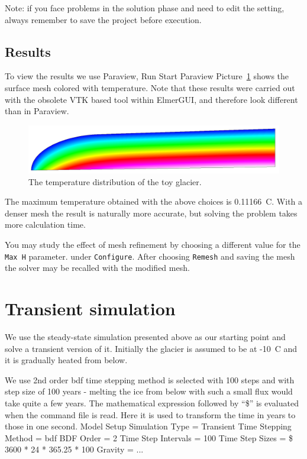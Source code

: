 Note: if you face problems in the solution phase and need to edit the setting, always remember to save
the project before execution.

\subsection*{Results}

To view the results we use Paraview,
\ttbegin
Run
  Start Paraview
\ttend
Picture~\ref{glac:figtemp} shows
the surface mesh colored with temperature.
Note that these results were carried out with the obsolete
VTK based tool within ElmerGUI, and therefore look different than in Paraview.

\begin{figure}
\begin{center}
\includegraphics[width=120mm]{glacier_toy_temp}
\caption{The temperature distribution of the toy glacier.}\label{glac:figtemp}
\end{center}
\end{figure}


The maximum temperature obtained with the above choices is 0.11166~C. 
With a denser mesh the result is
naturally more accurate, but solving the problem takes more calculation time.

You may study the effect of mesh refinement by choosing 
a different value for the \texttt{Max H} parameter.
under \texttt{Configure}. After choosing \texttt{Remesh} and saving the mesh 
the solver may be recalled with the modified mesh.


\section*{Transient simulation}

We use the steady-state simulation presented above as our starting point and 
solve a transient version of it. Initially the glacier is assumed to be at -10~C 
and it is gradually heated from below. 


We use 2nd order bdf time stepping method is selected with 100 steps
and with step size of 100 years - melting the ice from below with such a small flux 
would take quite a few years. 
The mathematical expression followed 
by ``\$'' is evaluated when the command file is read.
Here it is used to transform the time in years to those in one second. 
\ttbegin
Model
  Setup 
    Simulation Type = Transient
    Time Stepping Method = bdf
    BDF Order = 2
    Time Step Intervals = 100
    Time Step Sizes = \$ 3600 * 24 * 365.25 * 100
    Gravity = ...
\ttend

